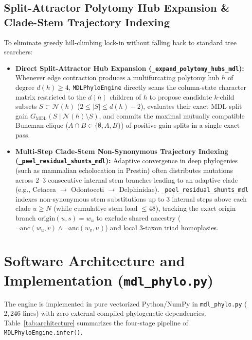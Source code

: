 \documentclass[11pt,a4paper]{article}
\begin{document}
\subsection{Split-Attractor Polytomy Hub Expansion \& Clade-Stem Trajectory Indexing}

To eliminate greedy hill-climbing lock-in without falling back to standard tree searchers:
\begin{itemize}[leftmargin=1.8em]
    \item \textbf{Direct Split-Attractor Hub Expansion (\texttt{\_expand\_polytomy\_hubs\_mdl}):} Whenever edge contraction produces a multifurcating polytomy hub $h$ of degree $d(h) \ge 4$, \texttt{MDLPhyloEngine} directly scans the column-state character matrix restricted to the $d(h)$ children of $h$ to propose candidate $k$-child subsets $S \subset \mathcal{N}(h)$ ($2 \le |S| \le d(h)-2$), evaluates their exact MDL split gain $G_{\text{MDL}}(S \mid \mathcal{N}(h)\setminus S)$, and commits the maximal mutually compatible Buneman clique ($A \cap B \in \{\emptyset, A, B\}$) of positive-gain splits in a single exact pass.
    \item \textbf{Multi-Step Clade-Stem Non-Synonymous Trajectory Indexing (\texttt{\_peel\_residual\_shunts\_mdl}):} Adaptive convergence in deep phylogenies (such as mammalian echolocation in Prestin) often distributes mutations across $2\text{--}3$ consecutive internal stem branches leading to an adaptive clade (e.g., Cetacea $\to$ Odontoceti $\to$ Delphinidae). \texttt{\_peel\_residual\_shunts\_mdl} indexes non-synonymous stem substitutions up to $3$ internal steps above each clade $u \ge N$ (while cumulative stem load $\le 48$), tracking the exact origin branch $\text{origin}(u,s) = w_u$ to exclude shared ancestry ($\neg\text{anc}(w_u, v) \wedge \neg\text{anc}(w_v, u)$) and local 3-taxon triad homoplasies.
\end{itemize}

\section{Software Architecture and Implementation (\texttt{mdl\_phylo.py})}

The engine is implemented in pure vectorized Python/NumPy in \texttt{mdl\_phylo.py} ($2,246$ lines) with zero external compiled phylogenetic dependencies. Table~\ref{tab:architecture} summarizes the four-stage pipeline of \texttt{MDLPhyloEngine.infer()}.
\end{document}
